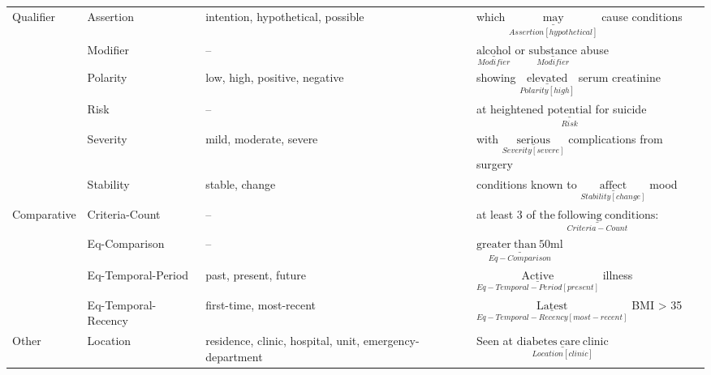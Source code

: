 \begin{tabular}{m{2cm} m{2.5cm} m{4.9cm} m{6.5cm}}
    \multirow{6}{*}[-16pt]{\mbox{Qualifier}} &
        Assertion
            & intention, hypothetical, possible
            & which $\underset{Assertion[hypothetical]}{\underline{\mathrm{may}}}$ cause conditions \\
         & Modifier
            & --
            & $\underset{Modifier}{\underline{\mathrm{alcohol}}}$ or $\underset{Modifier}{\underline{\mathrm{substance}}}$ abuse  \\
         & Polarity 
                & low, high, positive, negative 
                & showing $\underset{Polarity[high]}{\underline{\mathrm{elevated}}}$ serum creatinine  \\
         & Risk
            & -- 
            & at heightened $\underset{Risk}{\underline{\mathrm{potential}}}$ for suicide \\
         & Severity 
            & mild, moderate, severe 
            & with $\underset{Severity[severe]}{\underline{\mathrm{serious}}}$ complications from surgery  \\
         & Stability 
                & stable, change 
                & conditions known to $\underset{Stability[change]}{\underline{\mathrm{affect}}}$ mood \\[2ex]
    \hline
    \multirow{4}{*}[-17pt]{Comparative} &
        Criteria-Count
            & --
            & at least 3 of $\underset{Criteria-Count}{\underline{\mathrm{the\ following\ conditions}}}$: \\
     & Eq-Comparison
            & --
            & $\underset{Eq-Comparison}{\underline{\mathrm{greater\ than\ 50ml}}}$ \\
     
     & Eq-Temporal-Period
            & past, present, future
            & $\underset{Eq-Temporal-Period[present]}{\underline{\mathrm{Active}}}$ illness \\
     & Eq-Temporal-Recency
            & first-time, most-recent
            & $\underset{Eq-Temporal-Recency[most-recent]}{\underline{\mathrm{Latest}}}$ BMI > 35 \\
            
    \hline   
    Other &
       Location 
            & residence, clinic, hospital, unit, emergency-department  
            & Seen at $\underset{Location[clinic]}{\underline{\mathrm{diabetes\ care\ clinic}}}$ \\[2ex]
    
\end{tabular}